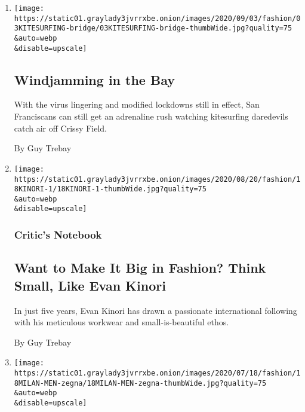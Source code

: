 \begin{enumerate}
\def\labelenumi{\arabic{enumi}.}
\item
  \href{/2020/09/03/style/kitesurfing-windjamming-in-the-bay.html}{}

  \texttt{[image: https://static01.graylady3jvrrxbe.onion/images/2020/09/03/fashion/03KITESURFING-bridge/03KITESURFING-bridge-thumbWide.jpg?quality=75\\\&auto=webp\\\&disable=upscale]}

  \hypertarget{windjamming-in-the-bay}{%
  \subsection{Windjamming in the Bay}\label{windjamming-in-the-bay}}

  With the virus lingering and modified lockdowns still in effect, San
  Franciscans can still get an adrenaline rush watching kitesurfing
  daredevils catch air off Crissy Field.

  By Guy Trebay
\item
  \href{/2020/08/19/fashion/evan-kinori-menswear.html}{}

  \texttt{[image: https://static01.graylady3jvrrxbe.onion/images/2020/08/20/fashion/18KINORI-1/18KINORI-1-thumbWide.jpg?quality=75\\\&auto=webp\\\&disable=upscale]}

  \hypertarget{critics-notebook}{%
  \subsubsection{Critic's Notebook}\label{critics-notebook}}

  \hypertarget{want-to-make-it-big-in-fashion-think-small-like-evan-kinori}{%
  \subsection{Want to Make It Big in Fashion? Think Small, Like Evan
  Kinori}\label{want-to-make-it-big-in-fashion-think-small-like-evan-kinori}}

  In just five years, Evan Kinori has drawn a passionate international
  following with his meticulous workwear and small-is-beautiful ethos.

  By Guy Trebay
\item
  \href{/2020/07/17/style/mens-fashion-milan-provides-reasons-to-be-cheerful.html}{}

  \texttt{[image: https://static01.graylady3jvrrxbe.onion/images/2020/07/18/fashion/18MILAN-MEN-zegna/18MILAN-MEN-zegna-thumbWide.jpg?quality=75\\\&auto=webp\\\&disable=upscale]}


\end{enumerate}
